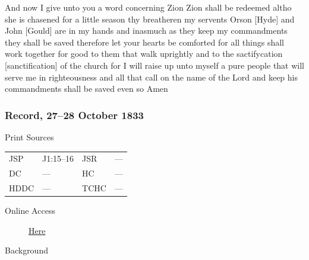 				And now I give unto you a word concerning Zion Zion shall be redeemed altho she is chasened for a little season thy breatheren my servents Orson [Hyde] and John [Gould] are in my hands and inasmuch as they keep my commandments they shall be saved therefore let your hearts be comforted for all things shall work together for good to them that walk uprightly and to the sactifycation [sanctification] of the church for I will raise up unto myself a pure people that will serve me in righteousness and all that call on the name of the Lord and keep his commandments shall be saved even so Amen
				
		\subsubsection{Record, 27--28 October 1833}
			\label{EMS-1833-JS-27-28-OCT-1833}
		
			\begin{description}
				\item[Print Sources]
			\end{description}

				\begin{tabular}{p{0.5in}p{1in}p{0.5in}p{1in}}
				JSP	 	& J1:15--16	& JSR 		& --- \\
				DC	 	& ---	& HC 		& --- \\
				HDDC 	& ---	& TCHC 		& --- \\
				\end{tabular}
			
			\begin{description}
				\item[Online Access] \href{https://www.josephsmithpapers.org/paper-summary/journal-1832-1834/16}{Here}
			\end{description}
			
			\begin{description}
				\item[Background]
			\end{description}
			
			
